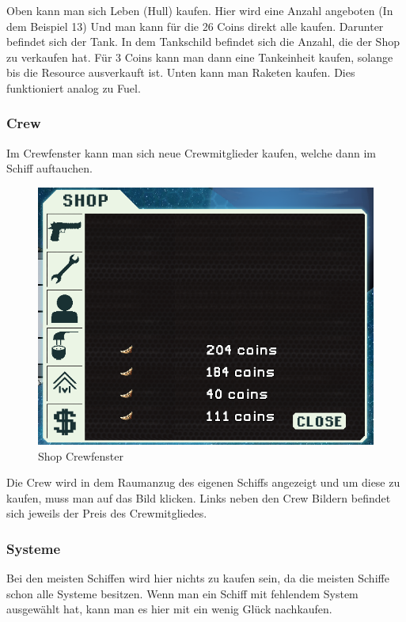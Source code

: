 \documentclass[fontsize=12pt,paper=a4,twoside]{scrartcl}
\begin{document}
Oben kann man sich Leben (Hull) kaufen. Hier wird eine Anzahl angeboten (In dem Beispiel 13) Und man kann für die 26 Coins direkt alle kaufen. Darunter befindet sich der Tank. In dem Tankschild befindet sich die Anzahl, die der Shop zu verkaufen hat. Für 3 Coins kann man dann eine Tankeinheit kaufen, solange bis die Resource ausverkauft ist. Unten kann man Raketen kaufen. Dies funktioniert analog zu Fuel. 

\subsubsection{Crew}

Im Crewfenster kann man sich neue Crewmitglieder kaufen, welche dann im Schiff auftauchen. 

\begin{figure}[H]
\centering
\includegraphics[width=1\linewidth]{DasSpiel/Shop/crew.png}
\caption{Shop Crewfenster}
\end{figure}

Die Crew wird in dem Raumanzug des eigenen Schiffs angezeigt und um diese zu kaufen, muss man auf das Bild klicken. Links neben den Crew Bildern befindet sich jeweils der Preis des Crewmitgliedes. 

\subsubsection{Systeme}

Bei den meisten Schiffen wird hier nichts zu kaufen sein, da die meisten Schiffe schon alle Systeme besitzen. Wenn man ein Schiff mit fehlendem System ausgewählt hat, kann man es hier mit ein wenig Glück nachkaufen. 
\end{document}
